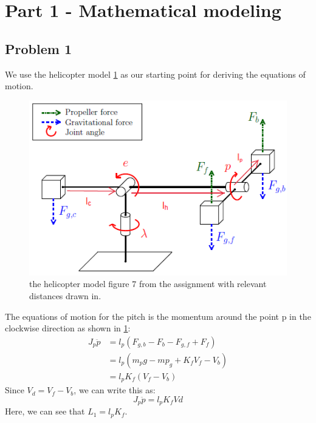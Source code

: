 
\def\SPSB#1#2{\rlap{\textsuperscript{{#1}}}\SB{#2}}
\def\SP#1{\textsuperscript{{#1}}}
\def\SB#1{\textsubscript{{#1}}}


\section{Part 1 - Mathematical modeling}
\subsection{Problem 1}

We use the helicopter model \cref{fig:helicopter_model} as our starting point for deriving the equations of motion.
\begin{figure}[hbp]
\caption{the helicopter model figure 7 from the assignment \cite[p.12]{assignment} with relevant distances drawn in.}
\label{fig:helicopter_model}
\includegraphics[width=\textwidth]{images/helicopter_model}
\end{figure}

The equations of motion for the pitch is the momentum around the point p in the clockwise direction as shown in \cref{fig:helicopter_model}:
\begin{align*}
J_p\ddot{p} &= l_p(F_{g,b} - F_b - F_{g,f} + F_f) \\
						&= l_p(m_pg - mp_g + K_fV_f - V_b) \\
						&= l_pK_f(V_f-V_b)
\end{align*}
Since $V_d = V_f-V_b$, we can write this as:
\begin{equation}
J_p\ddot{p} = l_pK_fVd
\end{equation}
Here, we can see that $L_1 = l_pK_f$.

